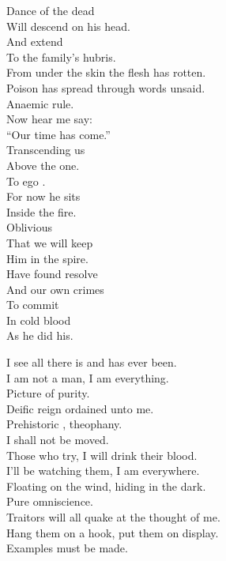 Dance of the dead \\
Will descend on his head. \\
And extend \\
To the family's hubris. \\

From under the skin the flesh has rotten. \\
Poison has spread through words unsaid. \\
Anaemic rule. \\

Now hear me say: \\
``Our time has come.'' \\
Transcending us \\
Above the one. \\
To ego . \\

For now he sits \\
Inside the fire. \\
Oblivious \\
That we will keep \\
Him in the spire. \\

Have found resolve \\
And our own crimes \\
To commit \\
In cold blood \\
As he did his. \\





I see all there is and has ever been. \\
I am not a man, I am everything. \\
Picture of purity. \\

Deific reign ordained unto me. \\
Prehistoric , theophany. \\
I shall not be moved. \\
Those who try, I will drink their blood. \\

I'll be watching them, I am everywhere. \\
Floating on the wind, hiding in the dark. \\
Pure omniscience. \\
Traitors will all quake at the thought of me. \\
Hang them on a hook, put them on display. \\
Examples must be made. \\

